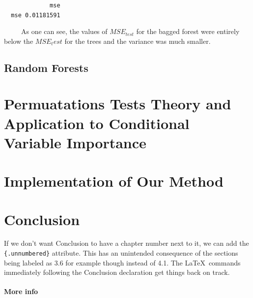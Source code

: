 \documentclass[12pt,twoside]{reedthesis}
\begin{document}
  \begin{Shaded}
  \begin{Highlighting}[]
  \end{Highlighting}
  \end{Shaded}
  
  \begin{verbatim}
             mse
  mse 0.01181591
  \end{verbatim}
  
  ~~~~~As one can see, the values of \(MSE_{test}\) for the bagged forest
  were entirely below the \(MSE_test\) for the trees and the variance was
  much smaller.
  
  \section{Random Forests}\label{random-forests}
  
  \chapter{Permuatations Tests Theory and Application to Conditional
  Variable
  Importance}\label{permuatations-tests-theory-and-application-to-conditional-variable-importance}
  
  \chapter{Implementation of Our
  Method}\label{implementation-of-our-method}
  
  \chapter*{Conclusion}\label{conclusion}
  
  \setcounter{chapter}{4} \setcounter{section}{0}
  
  If we don't want Conclusion to have a chapter number next to it, we can
  add the \texttt{\{.unnumbered\}} attribute. This has an unintended
  consequence of the sections being labeled as 3.6 for example though
  instead of 4.1. The \LaTeX~commands immediately following the Conclusion
  declaration get things back on track.
  
  \subsubsection{More info}\label{more-info}
  
\end{document}
